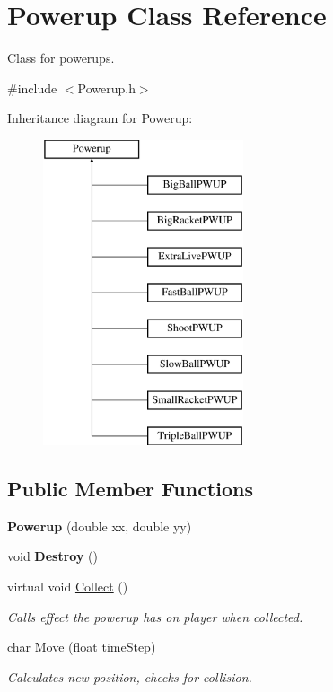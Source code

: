 \hypertarget{class_powerup}{}\section{Powerup Class Reference}
\label{class_powerup}


Class for powerups.  




{\ttfamily \#include $<$Powerup.\+h$>$}

Inheritance diagram for Powerup\+:\begin{figure}[H]
\begin{center}
\leavevmode
\includegraphics[height=9.000000cm]{class_powerup}
\end{center}
\end{figure}
\subsection*{Public Member Functions}
\begin{DoxyCompactItemize}
\item 
\mbox{\label{class_powerup_ab4bdb1e3b63095c936d2505ffce31f3e}} 
{\bfseries Powerup} (double xx, double yy)
\item 
\mbox{\label{class_powerup_a8a2434d845b29044736c2618b1fce1db}} 
void {\bfseries Destroy} ()
\item 
\mbox{\label{class_powerup_a27c8857f4e41c6d09efcc4447a9102cf}} 
virtual void \hyperlink{class_powerup_a27c8857f4e41c6d09efcc4447a9102cf}{Collect} ()
\begin{DoxyCompactList}\small\item\em Calls effect the powerup has on player when collected. \end{DoxyCompactList}\item 
char \hyperlink{class_powerup_a5e81fffa256f0f339c4ac430d897a1ae}{Move} (float time\+Step)
\begin{DoxyCompactList}\small\item\em Calculates new position, checks for collision. \end{DoxyCompactList}\end{DoxyCompactItemize}
